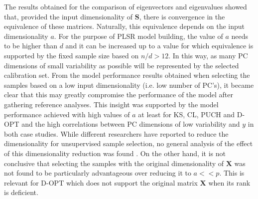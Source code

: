\documentclass[journal=ancham,manuscript=article]{achemso}
\begin{document}
The results obtained for the comparison of eigenvectors and eigenvalues showed that, provided the input dimensionality of $\mathbf{S}$, there is convergence in the equivalence of these matrices. Naturally, this equivalence depends on the input dimensionality $a$. For the purpose of PLSR model building, the value of $a$ needs to be higher than $d$ and it can be increased up to a value for which equivalence is supported by the fixed sample size based on $n/d>12$. In this way, as many PC dimensions of small variability as possible will be represented by the selected calibration set. From the model performance results obtained when selecting the samples based on a low input dimensionality (i.e. low number of PC's), it became clear that this may greatly compromise the performance of the model after gathering reference analyses. This insight was supported by the model performance achieved with high values of $a$ at least for KS, CL, PUCH and D-OPT and the high correlations between PC dimensions of low variability and $y$ in both case studies. While different researchers have reported to reduce the dimensionality for unsupervised sample selection, no general analysis of the effect of this dimensionality reduction was found \cite{Naes1990, Brandmaier2012, Nawar2018, Au2020}. On the other hand, it is not conclusive that selecting the samples with the original dimensionality of $\mathbf{X}$ was not found to be particularly advantageous over reducing it to $a<<p$. This is relevant for D-OPT which does not support the original matrix $\mathbf{X}$ when its rank is deficient.
\end{document}
